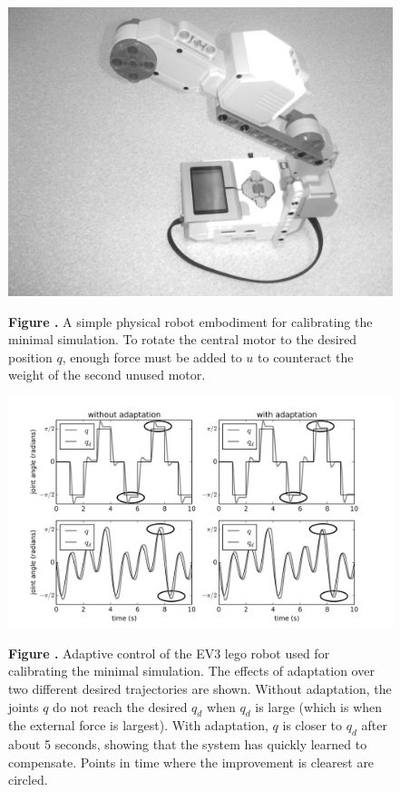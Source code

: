 \documentclass{frontiersSCNS} %
\begin{document}
\begin{figure}[h!]
\begin{center}
\includegraphics[width=18cm]{figures/lego}
\end{center}
 \textbf{\label{fig:lego} Figure .}{ A
     simple physical robot embodiment for calibrating the minimal simulation.
     To rotate the central motor to the desired position $q$, enough force
 must be added to $u$ to counteract the weight of the second unused motor.}
\end{figure}

\begin{figure}[h!]
\begin{center}
\includegraphics[width=18cm]{figures/fig_ev3}
\end{center}
 \textbf{\label{fig:ev3} Figure .}{ Adaptive control of the EV3 lego robot used for calibrating the minimal simulation.
 The effects of adaptation over two different desired trajectories are shown.  Without adaptation, the joints $q$ do not reach the desired $q_d$ when $q_d$ is large (which
 is when the external force is largest).  With adaptation, $q$ is closer to $q_d$ after about 5 seconds, showing that the system has quickly learned to compensate.
 Points in time where the improvement is clearest are circled.}
\end{figure}
\end{document}
